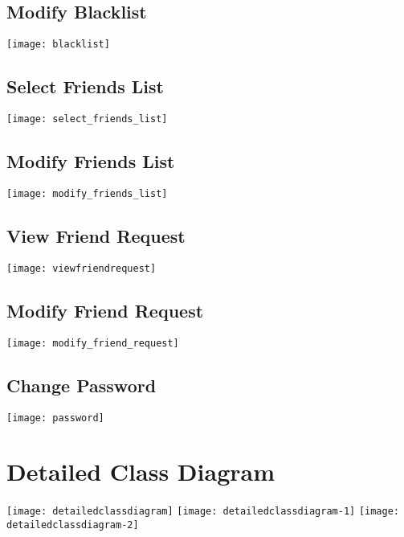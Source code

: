 \documentclass[english]{article}
\begin{document}
\subsection{Modify Blacklist}
\texttt{[image: blacklist]}

\subsection{Select Friends List}
\texttt{[image: select\_friends\_list]}

\subsection{Modify Friends List}
\texttt{[image: modify\_friends\_list]}

\subsection{View Friend Request}
\texttt{[image: viewfriendrequest]}

\subsection{Modify Friend Request}
\texttt{[image: modify\_friend\_request]}

\subsection{Change Password}
\texttt{[image: password]}


\section{Detailed Class Diagram}
\label{sec:detailed_class_diagram}
\texttt{[image: detailedclassdiagram]}
\clearpage
\texttt{[image: detailedclassdiagram-1]}
\clearpage
\texttt{[image: detailedclassdiagram-2]}
\end{document}
